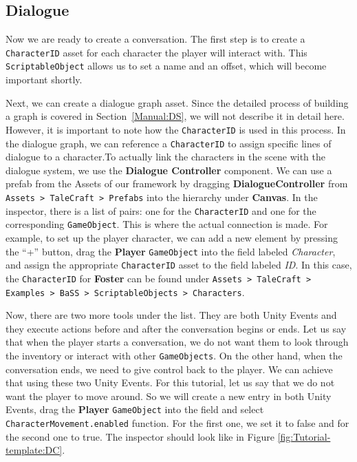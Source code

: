 \subsection{Dialogue}
\label{Manual:Tutorial:D}
Now we are ready to create a conversation. The first step is to create a \texttt{CharacterID} asset for each character the player will interact with. This \texttt{ScriptableObject} allows us to set a name and an offset, which will become important shortly.

Next, we can create a dialogue graph asset. Since the detailed process of building a graph is covered in Section~\ref{Manual:DS}, we will not describe it in detail here. However, it is important to note how the \texttt{CharacterID} is used in this process. In the dialogue graph, we can reference a \texttt{CharacterID} to assign specific lines of dialogue to a character.To actually link the characters in the scene with the dialogue system, we use the \textbf{Dialogue Controller} component. We can use a prefab from the Assets of our framework by dragging \textbf{DialogueController} from \texttt{Assets > TaleCraft > Prefabs} into the hierarchy under \textbf{Canvas}. In the inspector, there is a list of pairs: one for the \texttt{CharacterID} and one for the corresponding \texttt{GameObject}. This is where the actual connection is made. For example, to set up the player character, we can add a new element by pressing the “+” button, drag the \textbf{Player} \texttt{GameObject} into the field labeled \textit{Character}, and assign the appropriate \texttt{CharacterID} asset to the field labeled \textit{ID}. In this case, the \texttt{CharacterID} for \textbf{Foster} can be found under \texttt{Assets > TaleCraft > Examples > BaSS > ScriptableObjects > Characters}.

Now, there are two more tools under the list. They are both Unity Events and they execute actions before and after the conversation begins or ends. Let us say that when the player starts a conversation, we do not want them to look through the inventory or interact with other \texttt{GameObjects}. On the other hand, when the conversation ends, we need to give control back to the player. We can achieve that using these two Unity Events. For this tutorial, let us say that we do not want the player to move around. So we will create a new entry in both Unity Events, drag the \textbf{Player} \texttt{GameObject} into the field and select \texttt{CharacterMovement.enabled} function. For the first one, we set it to false and for the second one to true. The inspector should look like in Figure \ref{fig:Tutorial-template:DC}.

